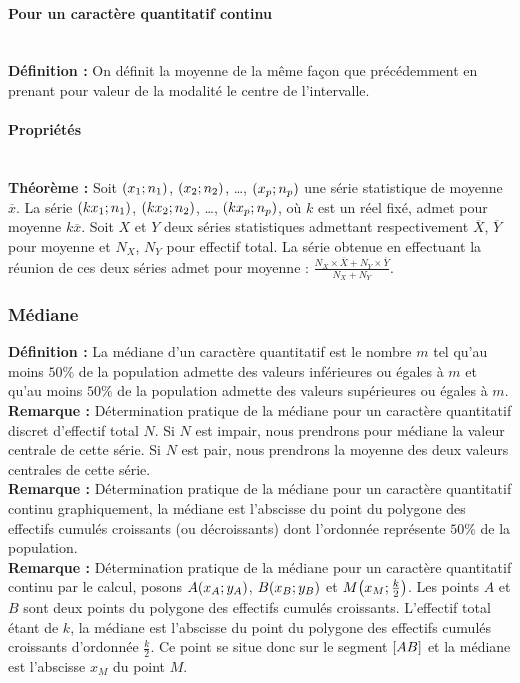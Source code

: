 \documentclass[a4paper,titlepage]{article}
\let\oldleft\left
\renewcommand{\left}{\mathopen{}\mathclose\bgroup\oldleft}
\let\oldright\right
\renewcommand{\right}{\aftergroup\egroup\oldright}
\begin{document}
            \paragraph{Pour un caractère quantitatif continu}\mbox{}\\
                \textbf{Définition :} On définit la moyenne de la même façon que précédemment en prenant pour valeur de la modalité le centre de l’intervalle.
            \paragraph{Propriétés}\mbox{}\\
                \textbf{Théorème :} Soit $\left(x_{1};n_{1}\right)$, $\left(x_{2};n_{2}\right)$, \ldots, $\left(x_{p};n_{p}\right)$ une série statistique de moyenne $\overline{x}$. La série $\left(kx_{1};n_{1}\right)$, $\left(kx_{2};n_{2}\right)$, \ldots, $\left(kx_{p};n_{p}\right)$, où $k$ est un réel fixé, admet pour moyenne $k\overline{x}$. Soit $X$ et $Y$ deux séries statistiques admettant respectivement $\overline{X}$, $\overline{Y}$ pour moyenne et $N_{X}$, $N_{Y}$ pour effectif total. La série obtenue en effectuant la réunion de ces deux séries admet pour moyenne : $\frac{N_{X}\times\overline{X}+N_{Y}\times\overline{Y}}{N_{X}+N_{Y}}$.
        \subsubsection{Médiane}
            \textbf{Définition :} La médiane d’un caractère quantitatif est le nombre $m$ tel qu’au moins $50\%$ de la population admette des valeurs inférieures ou égales à $m$ et qu’au moins $50\%$ de la population admette des valeurs supérieures ou égales à $m$.
            \\
            \textbf{Remarque :} Détermination pratique de la médiane pour un caractère quantitatif discret d’effectif total $N$. Si $N$ est impair, nous prendrons pour médiane la valeur centrale de cette série. Si $N$ est pair, nous prendrons la moyenne des deux valeurs centrales de cette série.
            \\
            \textbf{Remarque :} Détermination pratique de la médiane pour un caractère quantitatif continu graphiquement, la médiane est l’abscisse du point du polygone des effectifs cumulés croissants (ou décroissants) dont l’ordonnée représente $50\%$ de la population.
            \\
            \textbf{Remarque :} Détermination pratique de la médiane pour un caractère quantitatif continu par le calcul, posons $A\left(x_{A};y_{A}\right)$, $B\left(x_{B};y_{B}\right)$ et $M\left(x_{M};\frac{k}{2}\right)$. Les points $A$ et $B$ sont deux points du polygone des effectifs cumulés croissants. L’effectif total étant de $k$, la médiane est l’abscisse du point du polygone des effectifs cumulés croissants d’ordonnée $\frac{k}{2}$. Ce point se situe donc sur le segment $\left[AB\right]$ et la médiane est l’abscisse $x_{M}$ du point $M$.
\end{document}
